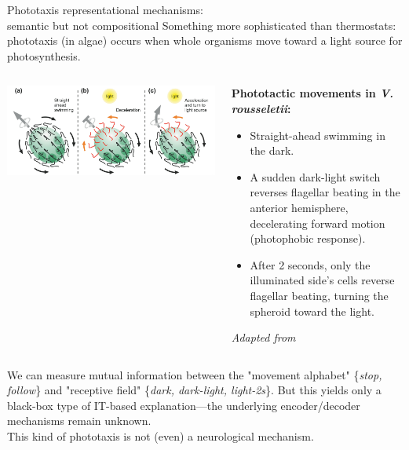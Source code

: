\documentclass[10pt, aspectratio=169]{beamer}
\begin{document}
\begin{frame}{Phototaxis representational mechanisms: \\ semantic but not compositional}
    \small
    Something more sophisticated than thermostats: phototaxis (in algae) occurs when whole organisms move toward a light source for photosynthesis.
    
    \begin{columns}
        \begin{column}{0.5\textwidth}
            \includegraphics[width=\linewidth]{images/phototaxis.png}
        \end{column}
        \begin{column}{0.5\textwidth}
            \textbf{Phototactic movements in \textit{V. rousseletii}:}
            \begin{itemize}
                \item  Straight-ahead swimming in the dark.
                \item  A sudden dark-light switch reverses flagellar beating in the anterior hemisphere, decelerating forward motion (photophobic response).
                \item  After 2 seconds, only the illuminated side's cells reverse flagellar beating, turning the spheroid toward the light.
            \end{itemize}
            \tiny \textit{Adapted from \cite{ueki_how_2010}}
        \end{column}
    \end{columns}
    
    \vspace{1em}
    
    We can measure mutual information between the "movement alphabet" \{\textit{stop, follow}\} and "receptive field" \{\textit{dark, dark-light, light-2s}\}. But this yields only a black-box type of IT-based explanation—the underlying encoder/decoder mechanisms remain unknown.\\
    
    This kind of phototaxis is not (even) a neurological mechanism.
    
    \end{frame}
    
\end{document}
